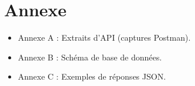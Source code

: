 \chapter*{Annexe}

\begin{itemize}
  \item Annexe A : Extraits d'API (captures Postman).
  \item Annexe B : Schéma de base de données.
  \item Annexe C : Exemples de réponses JSON.
\end{itemize}
